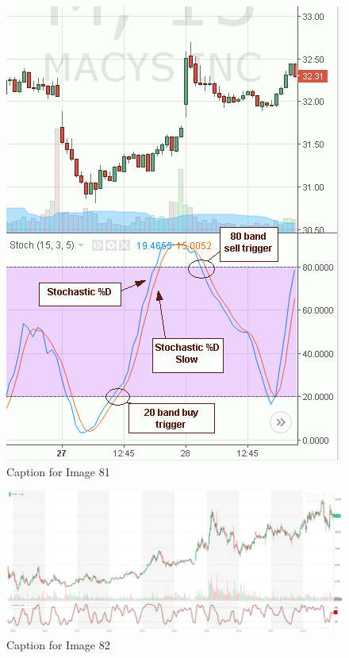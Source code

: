\documentclass{article}
\begin{document}
\begin{figure}[!htb]
    \centering
    \includegraphics[width=\textwidth]{imgs/81.png}
    \caption{Caption for Image 81}
\end{figure}

\vspace{10pt}

\begin{figure}[!htb]
    \centering
    \includegraphics[width=\textwidth]{imgs/82.png}
    \caption{Caption for Image 82}
\end{figure}
\end{document}
